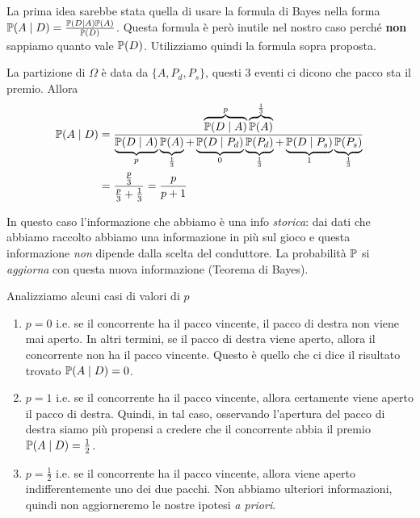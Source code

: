 \begin{enumerate}
	\begin{oss}
		La prima idea sarebbe stata quella di usare la formula di Bayes nella forma $\mathbb{P}(A\mid D) =\frac{\mathbb{P}(D\mid A)\mathbb{P}(A)}{\mathbb{P}(D)}$. Questa formula è però inutile nel nostro caso perché \textbf{non} sappiamo quanto vale $\mathbb{P}(D)$. Utilizziamo quindi la formula sopra proposta.
	\end{oss}

	La partizione di $\Omega $ è data da $\{A,P_{d} ,P_{s}\}$, questi $3$ eventi ci dicono che pacco sta il premio. Allora
	\begin{align*}
		\mathbb{P}(A\mid D) & =\frac{\overbrace{\mathbb{P}(D\mid A)}^{p}\overbrace{\mathbb{P}(A)}^{\frac{1}{3}}}{\underbrace{\mathbb{P}(D\mid A)}_{p}\underbrace{\mathbb{P}(A)}_{\frac{1}{3}} +\underbrace{\mathbb{P}(D\mid P_{d})}_{0}\underbrace{\mathbb{P}(P_{d})}_{\frac{1}{3}} +\underbrace{\mathbb{P}(D\mid P_{s})}_{1}\underbrace{\mathbb{P}(P_{s})}_{\frac{1}{3}}}\\
		 & =\frac{\frac{p}{3}}{\frac{p}{3} +\frac{1}{3}} =\frac{p}{p+1}
	\end{align*}

	\begin{oss}
		In questo caso l'informazione che abbiamo è una info \textit{storica}: dai dati che abbiamo raccolto abbiamo una informazione in più sul gioco e questa informazione \textit{non} dipende dalla scelta del conduttore. La probabilità $\mathbb{P}$ si \textit{aggiorna} con questa nuova informazione (Teorema di Bayes).
	\end{oss}

	Analizziamo alcuni casi di valori di $p$
	\begin{enumerate}
		\item $\boxed{p=0}$ i.e. se il concorrente ha il pacco vincente, il pacco di destra non viene mai aperto. In altri termini, se il pacco di destra viene aperto, allora il concorrente non ha il pacco vincente. Questo è quello che ci dice il risultato trovato $\mathbb{P}(A\mid D) =0$.
		\item $\boxed{p=1}$ i.e. se il concorrente ha il pacco vincente, allora certamente viene aperto il pacco di destra. Quindi, in tal caso, osservando l'apertura del pacco di destra siamo più propensi a credere che il concorrente abbia il premio $\mathbb{P}(A\mid D) =\frac{1}{2}$.
		\item $\boxed{p=\frac{1}{2}}$ i.e. se il concorrente ha il pacco vincente, allora viene aperto indifferentemente uno dei due pacchi. Non abbiamo ulteriori informazioni, quindi non aggiorneremo le nostre ipotesi \textit{a priori}.
	\end{enumerate}
\end{enumerate}

